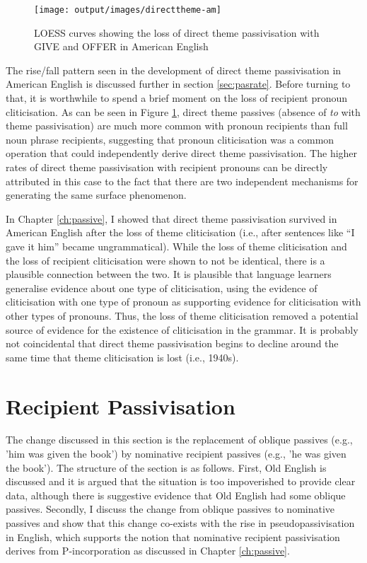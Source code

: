 	\begin{figure}[ht!]
		\texttt{[image: output/images/directtheme-am]}
		\caption{LOESS curves showing the loss of direct theme passivisation with GIVE and OFFER in American English}
		\label{fig:loss-of-dt-in-amen}
	\end{figure}

	The rise/fall pattern seen in the development of direct theme passivisation in American English is discussed further in section \ref{sec:pasrate}. Before turning to that, it is worthwhile to spend a brief moment on the loss of recipient pronoun cliticisation. As can be seen in Figure \ref{fig:loss-of-dt-in-amen}, direct theme passives (absence of \textit{to} with theme passivisation) are much more common with pronoun recipients than full noun phrase recipients, suggesting that pronoun cliticisation was a common operation that could independently derive direct theme passivisation. The higher rates of direct theme passivisation with recipient pronouns can be directly attributed in this case to the fact that there are two independent mechanisms for generating the same surface phenomenon.
	
	In Chapter \ref{ch:passive}, I showed that direct theme passivisation survived in American English after the loss of theme cliticisation (i.e., after sentences like ``I gave it him'' became ungrammatical). While the loss of theme cliticisation and the loss of recipient cliticisation were shown to not be identical, there is a plausible connection between the two. It is plausible that language learners generalise evidence about one type of cliticisation, using the evidence of cliticisation with one type of pronoun as supporting evidence for cliticisation with other types of pronouns. Thus, the loss of theme cliticisation removed a potential source of evidence for the existence of cliticisation in the grammar. It is probably not coincidental that direct theme passivisation begins to decline around the same time that theme cliticisation is lost (i.e., 1940s).
 
	\section{Recipient Passivisation}\label{sec:en-pas}

	The change discussed in this section is the replacement of oblique passives (e.g., 'him was given the book') by nominative recipient passives (e.g., 'he was given the book'). The structure of the section is as follows. First, Old English is discussed and it is argued that the situation is too impoverished to provide clear data, although there is suggestive evidence that Old English had some oblique passives. Secondly, I discuss the change from oblique passives to nominative passives and show that this change co-exists with the rise in pseudopassivisation in English, which supports the notion that nominative recipient passivisation derives from P-incorporation as discussed in Chapter \ref{ch:passive}. 

